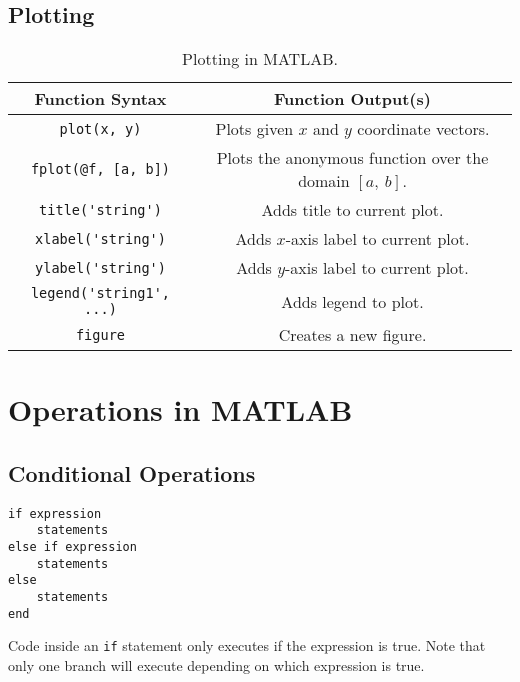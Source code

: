 \documentclass{article}
\begin{document}
\subsection{Plotting}
\begin{table}[H]
    \centering
    \begin{tabular}{c | c}
        \toprule
        Function Syntax                    & Function Output(s)                                                    \\
        \midrule
        \lstinline!plot(x, y)!             & Plots given $x$ and $y$ coordinate vectors.                           \\
        \lstinline!fplot(@f, [a, b])!      & Plots the anonymous function over the domain $\left[ a,\: b \right]$. \\
        \lstinline!title('string')!        & Adds title to current plot.                                           \\
        \lstinline!xlabel('string')!       & Adds $x$-axis label to current plot.                                  \\
        \lstinline!ylabel('string')!       & Adds $y$-axis label to current plot.                                  \\
        \lstinline!legend('string1', ...)! & Adds legend to plot.                                                  \\
        \lstinline!figure!                 & Creates a new figure.                                                 \\
        \bottomrule
    \end{tabular}
    \caption{Plotting in MATLAB.}
\end{table}
\section{Operations in MATLAB}
\subsection{Conditional Operations}
\begin{multicols}{2}
    \begin{lstlisting}
if expression
    statements
else if expression
    statements
else
    statements
end
    \end{lstlisting}
    \columnbreak
    Code inside an \lstinline{if} statement only executes if the expression is true. Note that only one branch will execute depending on which expression is true.
\end{multicols}
\end{document}
